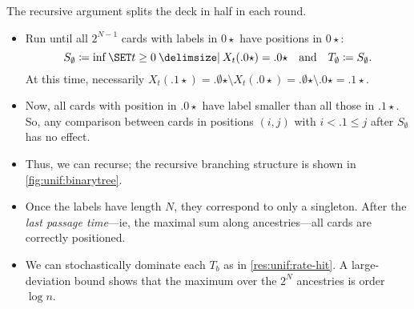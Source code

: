 \documentclass{article}
\newcommand{\mstar}{\mathord\star}
\begin{document}
\begin{Proof}[Outline]
\qedtriangle
The recursive argument splits the deck in half in each round.
\begin{itemize}
\item 
Run until all $2^{N-1}$ cards with labels in $0\star$ have positions in $0\star$:
\[
	S_\emptyset
\cq
	\inf\set{ t \ge 0 \given X_t(.0\star) = .0\star }
\Qand
	T_\emptyset
\cq
	S_\emptyset.
\]
At this time, necessarily $X_t(.1\star) = .\emptyset\mstar \setminus X_t(.0\star) = .\emptyset\mstar \setminus .0\star = .1\star$.

\item 
Now, all cards with position in $.0\star$ have label smaller than all those in $.1\star$.
So, any comparison between cards in positions $(i, j)$ with $i < .1 \le j$ after $S_\emptyset$ has no effect.

\item 
Thus, we can recurse; the recursive branching structure is shown in \cref{fig:unif:binarytree}.

\item 
Once the labels have length $N$, they correspond to only a singleton.
After the \textit{last passage time}---ie, the maximal sum along ancestries---all cards are correctly positioned.

\item 
We can stochastically dominate each $T_b$ as in \cref{res:unif:rate-hit}.
A large-deviation bound shows that the maximum over the $2^N$ ancestries is order $\log n$.
\qedhere
\end{itemize}
\end{Proof}
\end{document}
